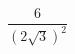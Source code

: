 \begin{ex}[type=calculate]
	\begin{condition}
		\( \dfrac{6}{(2\sqrt{3})^2} \)
	\end{condition}
\end{ex}